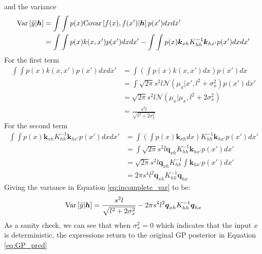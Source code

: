 \documentclass{article}
\begin{document}
\begin{appendices}
\begin{equation}
\begin{aligned}
        \end{aligned}
    \end{equation}
    and the variance
    \begin{equation}
        \begin{aligned}
            \text{Var}\left[\Tilde{y}|\boldsymbol{h}\right]&=\int\int p(x)\text{Covar}\left[f(x),f(x')|\boldsymbol{h}\right]p(x')dxdx' \\
            &=\int\int p(x)k(x,x')p(x')dxdx'-\int\int p(x)\boldsymbol{k}_{xh}K_{hh}^{-1}\boldsymbol{k}_{hx'}p(x')dxdx'
        \label{eq:incomplete_var}
        \end{aligned}
    \end{equation}
    For the first term
    \begin{equation}
        \begin{aligned}
            \int\int p(x)k(x,x')p(x')dxdx'&=\int\left(\int p(x)k(x,x')dx\right)p(x')dx \\
            &=\int \sqrt{2\pi}s^2l\mathcal{N}(\mu_x|x',l^2 + \sigma_x^2)p(x')dx' \\
            &=\sqrt{2\pi}s^2l\mathcal{N}(\mu_x|\mu_x,l^2+2\sigma_x^2) \\
            &=\frac{s^2l}{\sqrt{l^2+2\sigma_x^2}}
        \end{aligned}
    \end{equation}
    For the second term
    \begin{equation}
        \begin{aligned}
            \int\int p(x)\boldsymbol{k}_{xh}K_{hh}^{-1}\boldsymbol{k}_{hx'}p(x')dxdx'
            &=\int\left(\int p(x)\boldsymbol{k}_{xh}dx\right)K_{hh}^{-1}\boldsymbol{k}_{hx'}p(x')dx' \\
            &=\int \sqrt{2\pi}s^2l\boldsymbol{q}_{xh}K_{hh}^{-1}\boldsymbol{k}_{hx'}p(x')dx' \\
            &=\sqrt{2\pi}s^2l\boldsymbol{q}_{xh}K_{hh}^{-1} \int \boldsymbol{k}_{hx'}p(x')dx' \\
            &=2\pi s^4 l^2 \boldsymbol{q}_{xh}K_{hh}^{-1}\boldsymbol{q}_{hx}
        \end{aligned}
    \end{equation}
    Giving the variance in Equation \ref{eq:incomplete_var} to be:
    \begin{equation}
        \text{Var}\left[\Tilde{y}|\boldsymbol{h}\right]=\frac{s^2l}{\sqrt{l^2+2\sigma_x^2}} - 2\pi s^4 l^2 \boldsymbol{q}_{xh}K_{hh}^{-1}\boldsymbol{q}_{hx}
    \end{equation}
    As a sanity check, we can see that when $\sigma_x^2=0$ which indicates that the input $x$ is deterministic, the expressions return to the original GP posterior in Equation \ref{eq:GP_pred}
\end{appendices}
\end{document}
